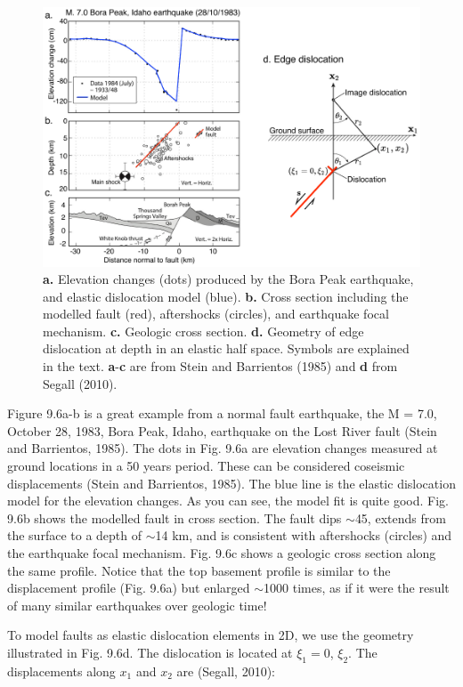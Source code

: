 \documentclass[a4paper , 12pt]{book}
\begin{document}
\begin{figure}[ht]
    \centering
    \includegraphics[width=14cm]{ch9f8.pdf}
    \caption{\textbf{a.} Elevation changes (dots) produced by the Bora Peak earthquake, and elastic dislocation model (blue). \textbf{b.} Cross section including the modelled fault (red), aftershocks (circles), and earthquake focal mechanism. \textbf{c.} Geologic cross section. \textbf{d.} Geometry of edge dislocation at depth in an elastic half space. Symbols are explained in the text. \textbf{a}-\textbf{c} are from Stein and Barrientos (1985) and \textbf{d} from Segall (2010).}
\end{figure}

Figure 9.6a-b is a great example from a normal fault earthquake, the M = 7.0, October 28, 1983, Bora Peak, Idaho, earthquake on the Lost River fault (Stein and Barrientos, 1985). The dots in Fig. 9.6a are elevation changes measured at ground locations in a 50 years period. These can be considered coseismic displacements (Stein and Barrientos, 1985). The blue line is the elastic dislocation model for the elevation changes. As you can see, the model fit is quite good. Fig. 9.6b shows the modelled fault in cross section. The fault dips $\sim$45\degree, extends from the surface to a depth of $\sim$14 km, and is consistent with aftershocks (circles) and the earthquake focal mechanism. Fig. 9.6c shows a geologic cross section along the same profile. Notice that the top basement profile is similar to the displacement profile (Fig. 9.6a) but enlarged $\sim$1000 times, as if it were the result of many similar earthquakes over geologic time!

To model faults as elastic dislocation elements in 2D, we use the geometry illustrated in Fig. 9.6d. The dislocation is located at $\xi_1 = 0$, $\xi_2$. The displacements along $x_1$ and $x_2$ are (Segall, 2010):
\end{document}
